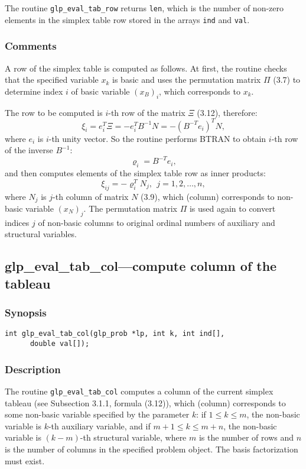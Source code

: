The routine \verb|glp_eval_tab_row| returns \verb|len|, which is the
number of non-zero elements in the simplex table row stored in the
arrays \verb|ind| and \verb|val|.

\subsubsection*{Comments}

A row of the simplex table is computed as follows. At first, the
routine checks that the specified variable $x_k$ is basic and uses the
permutation matrix $\Pi$ (3.7) to determine index $i$ of basic variable
$(x_B)_i$, which corresponds to $x_k$.

The row to be computed is $i$-th row of the matrix $\Xi$ (3.12),
therefore:
$$\xi_i=e_i^T\Xi=-e_i^TB^{-1}N=-(B^{-T}e_i)^TN,$$
where $e_i$ is $i$-th unity vector. So the routine performs BTRAN to
obtain $i$-th row of the inverse $B^{-1}$:
$$\varrho_i=B^{-T}e_i,$$
and then computes elements of the simplex table row as inner products:
$$\xi_{ij}=-\varrho_i^TN_j,\ \ j=1,2,\dots,n,$$
where $N_j$ is $j$-th column of matrix $N$ (3.9), which (column)
corresponds to non-basic variable $(x_N)_j$. The permutation matrix
$\Pi$ is used again to convert indices $j$ of non-basic columns to
original ordinal numbers of auxiliary and structural variables.

\subsection{glp\_eval\_tab\_col---compute column of the tableau}

\subsubsection*{Synopsis}

\begin{verbatim}
int glp_eval_tab_col(glp_prob *lp, int k, int ind[],
      double val[]);
\end{verbatim}

\subsubsection*{Description}

The routine \verb|glp_eval_tab_col| computes a column of the current
simplex tableau (see Subsection 3.1.1, formula (3.12)), which (column)
corresponds to some non-basic variable specified by the parameter $k$:
if $1\leq k\leq m$, the non-basic variable is $k$-th auxiliary variable,
and if $m+1\leq k\leq m+n$, the non-basic variable is $(k-m)$-th
structural variable, where $m$ is the number of rows and $n$ is the
number of columns in the specified problem object. The basis
factorization must exist.


